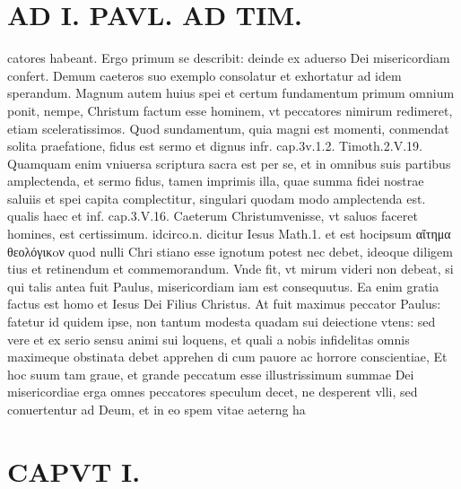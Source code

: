 \documentclass{article}
\begin{document}
\begin{pages}
\section*{AD I. PAVL. AD TIM. }
\marginpar{[ p.28. ]}\pstart catores habeant. Ergo primum se describit: deinde ex aduerso Dei misericordiam confert. Demum caeteros suo exemplo consolatur et exhortatur ad idem sperandum. Magnum autem huius spei et certum fundamentum primum omnium ponit, nempe, Christum factum esse hominem, vt peccatores nimirum redimeret, etiam sceleratissimos. Quod sundamentum, quia magni est momenti, conmendat solita praefatione, fidus est sermo et dignus infr. cap.3v.1.2. Timoth.2.V.19. Quamquam enim vniuersa scriptura sacra est per se, et in omnibus suis partibus amplectenda, et sermo fidus, tamen imprimis illa, quae summa fidei nostrae saluiis et spei capita complectitur, singulari quodam modo amplectenda est. qualis haec et inf. cap.3.V.16. Caeterum Christumvenisse, vt saluos faceret homines, est certissimum. idcirco.n. dicitur Iesus Math.1. et est hocipsum αἴτημα θεολόγικoν quod nulli Chri stiano esse ignotum potest nec debet, ideoque diligem tius et retinendum et commemorandum. Vnde fit, vt mirum videri non debeat, si qui talis antea fuit Paulus, misericordiam iam est consequutus. Ea enim gratia factus est homo et Iesus Dei Filius Christus. At fuit maximus peccator Paulus: fatetur id quidem ipse, non tantum modesta quadam sui deiectione vtens: sed vere et ex serio sensu animi sui loquens, et quali a nobis infidelitas omnis maximeque obstinata debet apprehen di cum pauore ac horrore conscientiae, Et hoc suum tam graue, et grande peccatum esse illustrissimum summae Dei misericordiae erga omnes peccatores speculum decet, ne desperent vlli, sed conuertentur ad Deum, et in eo spem vitae aeterng ha\pend
\section*{CAPVT  I. }
\marginpar{[ p.29 ]}\pstart {}
{}

\end{pages}
\end{document}
